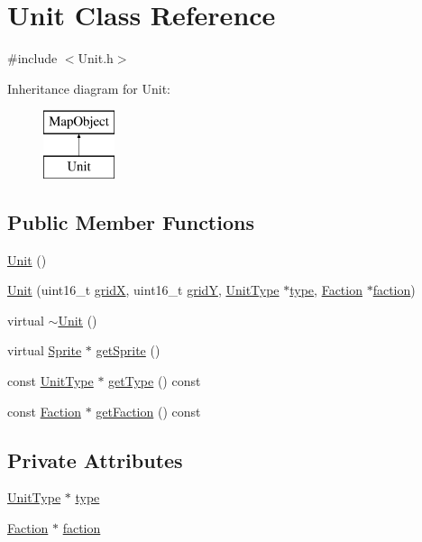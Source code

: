 \hypertarget{class_unit}{}\section{Unit Class Reference}
\label{class_unit}


{\ttfamily \#include $<$Unit.\+h$>$}

Inheritance diagram for Unit\+:\begin{figure}[H]
\begin{center}
\leavevmode
\includegraphics[height=2.000000cm]{da/db7/class_unit}
\end{center}
\end{figure}
\subsection*{Public Member Functions}
\begin{DoxyCompactItemize}
\item 
\hyperlink{class_unit_a8e46f663a95736c8002d85ab271a7581}{Unit} ()
\item 
\hyperlink{class_unit_ad2a3ea366d4ed09f0ea30551f5613bb9}{Unit} (uint16\+\_\+t \hyperlink{class_map_object_a48d8e19188fd7ae1b74d2de47d546209}{gridX}, uint16\+\_\+t \hyperlink{class_map_object_a0d3a76d4816097941bbfb5208b81cab6}{gridY}, \hyperlink{class_unit_type}{Unit\+Type} $\ast$\hyperlink{class_unit_ab0f889c1dcbe02864fad1fa6af62aa37}{type}, \hyperlink{class_faction}{Faction} $\ast$\hyperlink{class_unit_a4575f419a61dcd2c4d44754fe99ff3a4}{faction})
\item 
virtual \hyperlink{class_unit_a6353fc4c0a329997ad4abcf0dcb4eb27}{$\sim$\+Unit} ()
\item 
virtual \hyperlink{class_sprite}{Sprite} $\ast$ \hyperlink{class_unit_ad45ef5ba23edfa7a1f598a65629eb3e8}{get\+Sprite} ()
\item 
const \hyperlink{class_unit_type}{Unit\+Type} $\ast$ \hyperlink{class_unit_a6682f776bb4ad9aae1f32e849eed4137}{get\+Type} () const
\item 
const \hyperlink{class_faction}{Faction} $\ast$ \hyperlink{class_unit_a4e5ae48d922e36ec64e3a9b5424edc6d}{get\+Faction} () const
\end{DoxyCompactItemize}
\subsection*{Private Attributes}
\begin{DoxyCompactItemize}
\item 
\hyperlink{class_unit_type}{Unit\+Type} $\ast$ \hyperlink{class_unit_ab0f889c1dcbe02864fad1fa6af62aa37}{type}
\item 
\hyperlink{class_faction}{Faction} $\ast$ \hyperlink{class_unit_a4575f419a61dcd2c4d44754fe99ff3a4}{faction}
\end{DoxyCompactItemize}
